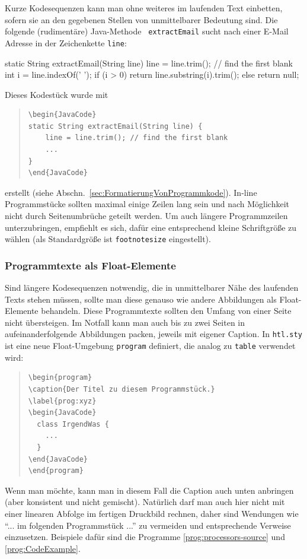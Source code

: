 Kurze Kodesequenzen kann man ohne weiteres im laufenden Text
einbetten, sofern sie an den gegebenen Stellen von unmittelbarer
Bedeutung sind. Die folgende (rudimentäre) Java-Methode {\tt
extractEmail} sucht nach einer E-Mail Adresse in der Zeichenkette
\texttt{line}:

\medskip
\begin{JavaCode}
static String extractEmail(String line) {
    line = line.trim(); // find the first blank
    int i = line.indexOf(' '); 
    if (i > 0)
        return line.substring(i).trim();
    else
        return null;
}
\end{JavaCode}
\medskip

\noindent
Dieses Kodestück wurde mit 
\begin{quote}
\begin{verbatim}
\begin{JavaCode}
static String extractEmail(String line) {
    line = line.trim(); // find the first blank
    ...
}
\end{JavaCode}
\end{verbatim}
\end{quote}
erstellt (siehe Abschn.\ \ref{sec:FormatierungVonProgrammkode}). In-line Programmstücke sollten maximal einige Zeilen lang sein und nach Möglichkeit nicht durch Seitenumbrüche geteilt werden.
Um auch längere Programmzeilen unterzubringen, empfiehlt es sich, dafür
eine entsprechend kleine Schriftgröße zu wählen (als Standardgröße ist
\texttt{footnotesize} eingestellt). 



\subsubsection{Programmtexte als Float-Elemente}
Sind längere Kodesequenzen notwendig, die in unmittelbarer Nähe des laufenden Texts
stehen müssen, sollte man diese genauso wie andere Abbildungen als Float-Elemente
behandeln. Diese Programmtexte sollten den Umfang von einer Seite nicht übersteigen.
Im Notfall kann man auch bis zu zwei Seiten in aufeinanderfolgende Abbildungen packen,
jeweils mit eigener Caption. In \texttt{htl.sty} ist eine neue Float-Umgebung
\texttt{program} definiert, die analog zu \texttt{table} verwendet wird:
%
\begin{quote}
\begin{verbatim}
\begin{program}
\caption{Der Titel zu diesem Programmstück.}
\label{prog:xyz}
\begin{JavaCode}
  class IrgendWas {
    ...
  }
\end{JavaCode}
\end{program}
\end{verbatim}
\end{quote}
%
Wenn man möchte, kann man in diesem Fall die Caption auch unten anbringen (aber konsistent und nicht gemischt).
Natürlich darf man auch hier  nicht mit einer linearen  Abfolge im fertigen
Druckbild rechnen, daher sind Wendungen wie
"`... im  folgenden Programmstück ..."' zu vermeiden und entsprechende Verweise
einzusetzen. Beispiele dafür sind die Programme \ref{prog:processors-source} und \ref{prog:CodeExample}.


